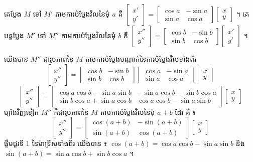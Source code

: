 គេប្លែង $M$ ទៅ $M'$ តាមការបំប្លែងវិលនៃមុំ $a$ គឺ $\begin{bmatrix} x'\\ y' \end{bmatrix} = \begin{bmatrix} \cos a & -\sin a\\ \sin a & \cos a \end{bmatrix}\begin{bmatrix} x\\ y \end{bmatrix}$ ។ គេបន្តប្លែង $M'$ ទៅ $M''$ តាមការបំប្លែងវិលនៃមុំ $b$ គឺ $\begin{bmatrix} x''\\ y'' \end{bmatrix} = \begin{bmatrix} \cos b & -\sin b\\ \sin b & \cos b \end{bmatrix}\begin{bmatrix} x'\\ y' \end{bmatrix}$ ។

យើងបាន $M''$ ជារូបភាពនៃ $M$ តាមការបំប្លែងបណ្ដាក់នៃការបំប្លែងវិលទាំងពីរ
\[ \begin{bmatrix} x''\\ y'' \end{bmatrix} = \begin{bmatrix} \cos b & -\sin b\\ \sin b & \cos b \end{bmatrix}\begin{bmatrix} \cos a & -\sin a\\ \sin a & \cos a \end{bmatrix}\begin{bmatrix} x\\ y \end{bmatrix} \]
\[ \begin{bmatrix} x''\\ y'' \end{bmatrix} = \begin{bmatrix} \cos a\cos b - \sin a\sin b & -\sin a\cos b - \sin b\cos a\\ \sin b\cos a + \sin a\cos b & \cos a\cos b - \sin a\sin b \end{bmatrix}\begin{bmatrix} x\\ y \end{bmatrix} \]
ម្យ៉ាងវិញទៀត $M''$ ក៏ជារូបភាពនៃ $M$ តាមការបំប្លែងវិលនៃមុំ $a + b$ ដែរ គឺ ៖
\[ \begin{bmatrix} x''\\ y'' \end{bmatrix} = \begin{bmatrix} \cos(a + b) & -\sin(a + b)\\ \sin(a + b) & \cos(a + b) \end{bmatrix}\begin{bmatrix} x\\ y \end{bmatrix} \]
ផ្ទឹមជួរទី $1$ នៃម៉ាទ្រីសទាំងពីរ យើងបាន ៖ $\cos(a + b) = \cos a\cos b - \sin a\sin b$ និង $\sin(a + b) = \sin a\cos b + \sin b\cos a$ ។

